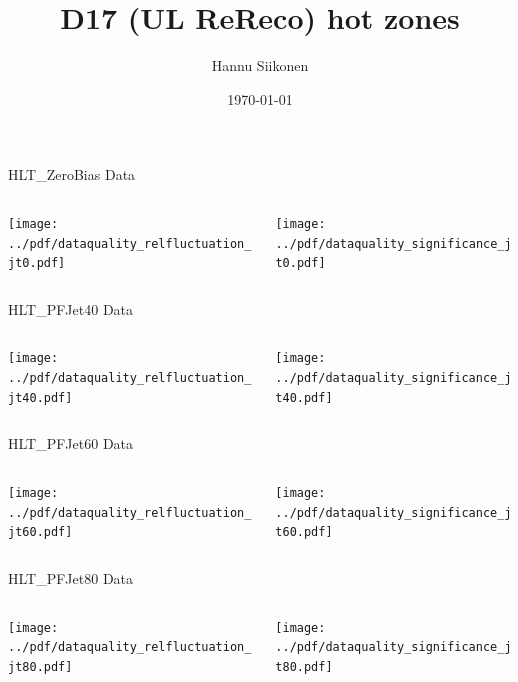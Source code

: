 \documentclass[9pt]{beamer}
\title[D17 (UL ReReco) hot zones]{D17 (UL ReReco) hot zones}
\author{Hannu Siikonen}
\institute{Helsinki Institute of Physics \\ \vspace{0.25cm} Instructor Adj.~Prof.~Mikko~Voutilainen}
\date{\today}
\begin{document}
\begin{frame}[t]
\titlepage
\end{frame}

\begin{frame}[t]{HLT\_ZeroBias Data}
\begin{columns}[T]
  \begin{column}{.5\textwidth}
  \texttt{[image: ../pdf/dataquality\_relfluctuation\_jt0.pdf]}
  \end{column}
  \begin{column}{.5\textwidth}
  \texttt{[image: ../pdf/dataquality\_significance\_jt0.pdf]}
  \end{column}
\end{columns}
\end{frame}

\begin{frame}[t]{HLT\_PFJet40 Data}
\begin{columns}[T]
  \begin{column}{.5\textwidth}
  \texttt{[image: ../pdf/dataquality\_relfluctuation\_jt40.pdf]}
  \end{column}
  \begin{column}{.5\textwidth}
  \texttt{[image: ../pdf/dataquality\_significance\_jt40.pdf]}
  \end{column}
\end{columns}
\end{frame}

\begin{frame}[t]{HLT\_PFJet60 Data}
\begin{columns}[T]
  \begin{column}{.5\textwidth}
  \texttt{[image: ../pdf/dataquality\_relfluctuation\_jt60.pdf]}
  \end{column}
  \begin{column}{.5\textwidth}
  \texttt{[image: ../pdf/dataquality\_significance\_jt60.pdf]}
  \end{column}
\end{columns}
\end{frame}

\begin{frame}[t]{HLT\_PFJet80 Data}
\begin{columns}[T]
  \begin{column}{.5\textwidth}
  \texttt{[image: ../pdf/dataquality\_relfluctuation\_jt80.pdf]}
  \end{column}
  \begin{column}{.5\textwidth}
  \texttt{[image: ../pdf/dataquality\_significance\_jt80.pdf]}
  \end{column}
\end{columns}
\end{frame}
\end{document}
